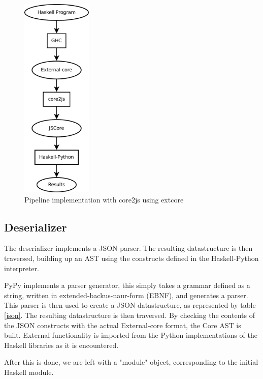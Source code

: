 \begin{figure}[H]
\begin{center}
\includegraphics[width=0.3\textwidth]{diags/pipe_w_core2js}
\caption[Pipeline with core2js]{Pipeline implementation with core2js using extcore}
\label{core2js}
\end{center}
\end{figure}

\subsection{Deserializer}

The deserializer implements a JSON parser. The resulting datastructure is then traversed, building up
an AST using the constructs defined in the Haskell-Python interpreter. 

PyPy implements a parser generator, this simply takes a grammar defined as a string, written in
extended-backus-naur-form (EBNF), and generates a parser. This parser is then used to create a 
JSON datastructure, as represented by table \ref{json}.
The resulting datastructure is then traversed. By checking the contents of the JSON constructs
with the actual External-core format, the Core AST is built. External functionality is imported
from the Python implementations of the Haskell libraries as it is encountered. 

After this is done, we are left with a "module" object, corresponding to the initial Haskell
module. 

